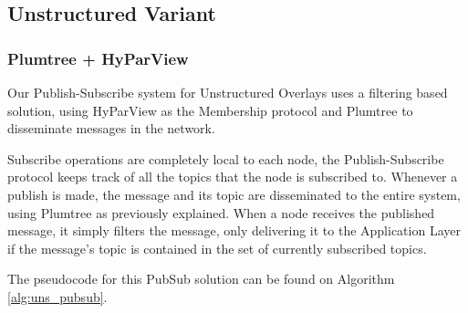 \documentclass[sigconf]{acmart}
\begin{document}
\subsection{Unstructured Variant}

\subsubsection{Plumtree + HyParView} %

Our Publish-Subscribe system for Unstructured Overlays uses a filtering based solution, using HyParView as the Membership protocol and Plumtree to disseminate messages in the network.

Subscribe operations are completely local to each node, the Publish-Subscribe protocol keeps track of all the topics that the node is subscribed to.
Whenever a publish is made, the message and its topic are disseminated to the entire system, using Plumtree as previously explained. When a node receives the published message, it simply filters the message, only delivering it to the Application Layer if the message's topic is contained in the set of currently subscribed topics.

The pseudocode for this PubSub solution can be found on Algorithm \ref{alg:uns_pubsub}.
\end{document}
